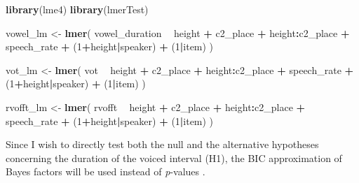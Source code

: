 \documentclass[11pt,]{article}
\newenvironment{Shaded}{\begin{snugshade}}{\end{snugshade}}
\newcommand{\DecValTok}[1]{\textcolor[rgb]{0.00,0.00,0.81}{#1}}
\newcommand{\KeywordTok}[1]{\textcolor[rgb]{0.13,0.29,0.53}{\textbf{#1}}}
\newcommand{\NormalTok}[1]{#1}
\newcommand{\OperatorTok}[1]{\textcolor[rgb]{0.81,0.36,0.00}{\textbf{#1}}}
\newcommand{\StringTok}[1]{\textcolor[rgb]{0.31,0.60,0.02}{#1}}
\begin{document}
\begin{Shaded}
\begin{Highlighting}[]
\KeywordTok{library}\NormalTok{(lme4)}
\KeywordTok{library}\NormalTok{(lmerTest)}

\NormalTok{vowel_lm <-}\StringTok{ }\KeywordTok{lmer}\NormalTok{(}
\NormalTok{  vowel_duration }\OperatorTok{~}
\StringTok{    }\NormalTok{height }\OperatorTok{+}
\StringTok{    }\NormalTok{c2_place }\OperatorTok{+}
\StringTok{    }\NormalTok{height}\OperatorTok{:}\NormalTok{c2_place }\OperatorTok{+}
\StringTok{    }\NormalTok{speech_rate }\OperatorTok{+}
\StringTok{    }\NormalTok{(}\DecValTok{1}\OperatorTok{+}\NormalTok{height}\OperatorTok{|}\NormalTok{speaker) }\OperatorTok{+}
\StringTok{    }\NormalTok{(}\DecValTok{1}\OperatorTok{|}\NormalTok{item)}
\NormalTok{)}

\NormalTok{vot_lm <-}\StringTok{ }\KeywordTok{lmer}\NormalTok{(}
\NormalTok{  vot }\OperatorTok{~}
\StringTok{    }\NormalTok{height }\OperatorTok{+}
\StringTok{    }\NormalTok{c2_place }\OperatorTok{+}
\StringTok{    }\NormalTok{height}\OperatorTok{:}\NormalTok{c2_place }\OperatorTok{+}
\StringTok{    }\NormalTok{speech_rate }\OperatorTok{+}
\StringTok{    }\NormalTok{(}\DecValTok{1}\OperatorTok{+}\NormalTok{height}\OperatorTok{|}\NormalTok{speaker) }\OperatorTok{+}
\StringTok{    }\NormalTok{(}\DecValTok{1}\OperatorTok{|}\NormalTok{item)}
\NormalTok{)}

\NormalTok{rvofft_lm <-}\StringTok{ }\KeywordTok{lmer}\NormalTok{(}
\NormalTok{  rvofft }\OperatorTok{~}
\StringTok{    }\NormalTok{height }\OperatorTok{+}
\StringTok{    }\NormalTok{c2_place }\OperatorTok{+}
\StringTok{    }\NormalTok{height}\OperatorTok{:}\NormalTok{c2_place }\OperatorTok{+}
\StringTok{    }\NormalTok{speech_rate }\OperatorTok{+}
\StringTok{    }\NormalTok{(}\DecValTok{1}\OperatorTok{+}\NormalTok{height}\OperatorTok{|}\NormalTok{speaker) }\OperatorTok{+}
\StringTok{    }\NormalTok{(}\DecValTok{1}\OperatorTok{|}\NormalTok{item)}
\NormalTok{)}
\end{Highlighting}
\end{Shaded}

Since I wish to directly test both the null and the alternative
hypotheses concerning the duration of the voiced interval (H1), the BIC
approximation of Bayes factors will be used instead of \emph{p}-values
\citep{raftery1995, raftery1999, wagenmakers2007, jarosz2014}.
\end{document}

